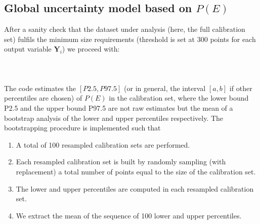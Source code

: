 \subsection{Global uncertainty model based on $P(E)$}
After a sanity check that the dataset under analysis (here, the full calibration set) fulfils the minimum size requirements (threshold is set at 300 points for each output variable $\mathbf{Y}_i$) we proceed with:\\
%
\paragraph{ \\}
The code estimates the $[P2.5, P97.5]$ (or in general, the interval $[a,b]$ if other percentiles are chosen) of $P(E)$ in the calibration set, where the lower bound P2.5 and the upper bound P97.5 are not raw estimates but the mean of a bootstrap analysis of the lower and upper percentiles respectively. The bootstrapping procedure is implemented such that
\begin{enumerate}
	\item A total of 100 resampled calibration sets are performed.
	\item Each resampled calibration set is built by randomly sampling (with replacement) a total number of points equal to the size of the calibration set.
	\item The lower and upper percentiles are computed in each resampled calibration set.
	\item We extract the mean of the sequence of 100 lower and upper percentiles.
\end{enumerate}
%
